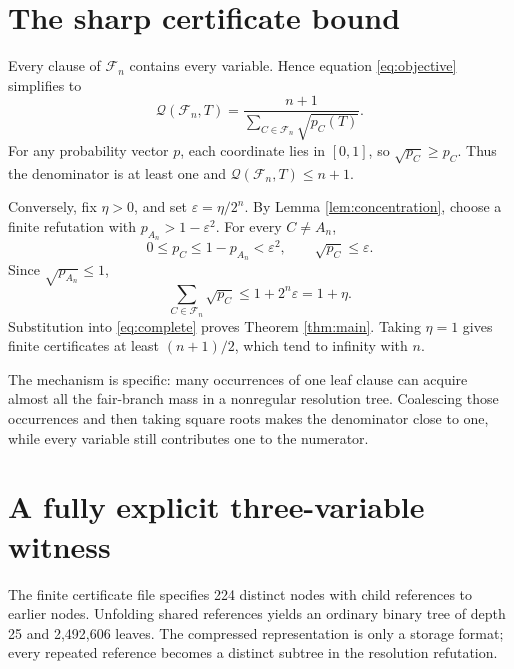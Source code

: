 \documentclass[11pt]{article}
\newcommand{\Q}{\mathcal Q}\newcommand{\F}{\mathcal F}
\begin{document}
\section{The sharp certificate bound}
Every clause of $\F_n$ contains every variable. Hence equation \eqref{eq:objective} simplifies to
\begin{equation}\label{eq:complete}
 \Q(\F_n,T)=\frac{n+1}{\sum_{C\in\F_n}\sqrt{p_C(T)}}.
\end{equation}
For any probability vector $p$, each coordinate lies in $[0,1]$, so $\sqrt{p_C}\ge p_C$. Thus the denominator is at least one and $\Q(\F_n,T)\le n+1$.

Conversely, fix $\eta>0$, and set $\varepsilon=\eta/2^n$. By Lemma \ref{lem:concentration}, choose a finite refutation with $p_{A_n}>1-\varepsilon^2$. For every $C\ne A_n$,
\[
 0\le p_C\le1-p_{A_n}<\varepsilon^2,
 \qquad \sqrt{p_C}\le\varepsilon.
\]
Since $\sqrt{p_{A_n}}\le1$,
\[
 \sum_{C\in\F_n}\sqrt{p_C}\le1+2^n\varepsilon=1+\eta.
\]
Substitution into \eqref{eq:complete} proves Theorem \ref{thm:main}. Taking $\eta=1$ gives finite certificates at least $(n+1)/2$, which tend to infinity with $n$.

The mechanism is specific: many occurrences of one leaf clause can acquire almost all the fair-branch mass in a nonregular resolution tree. Coalescing those occurrences and then taking square roots makes the denominator close to one, while every variable still contributes one to the numerator.

\clearpage
\section{A fully explicit three-variable witness}\label{sec:witness}
The finite certificate file specifies 224 distinct nodes with child references to earlier nodes. Unfolding shared references yields an ordinary binary tree of depth 25 and 2,492,606 leaves. The compressed representation is only a storage format; every repeated reference becomes a distinct subtree in the resolution refutation.
\end{document}
